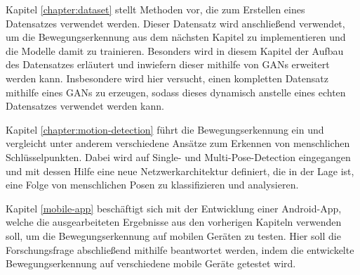 Kapitel \ref{chapter:dataset} stellt Methoden vor, die zum Erstellen eines
Datensatzes verwendet werden. Dieser Datensatz wird anschließend verwendet, um
die Bewegungserkennung aus dem nächsten Kapitel zu implementieren und die
Modelle damit zu trainieren. Besonders wird in diesem Kapitel der Aufbau des
Datensatzes erläutert und inwiefern dieser mithilfe von GANs erweitert werden
kann. Insbesondere wird hier versucht, einen kompletten Datensatz mithilfe eines
GANs zu erzeugen, sodass dieses dynamisch anstelle eines echten Datensatzes
verwendet werden kann.

Kapitel \ref{chapter:motion-detection} führt die Bewegungserkennung ein und
vergleicht unter anderem verschiedene Ansätze zum Erkennen von menschlichen
Schlüsselpunkten. Dabei wird auf Single- und Multi-Pose-Detection eingegangen
und mit dessen Hilfe eine neue Netzwerkarchitektur definiert, die in der Lage
ist, eine Folge von menschlichen Posen zu klassifizieren und analysieren.

Kapitel \ref{mobile-app} beschäftigt sich mit der Entwicklung einer
Android-App, welche die ausgearbeiteten Ergebnisse aus den vorherigen Kapiteln
verwenden soll, um die Bewegungserkennung auf mobilen Geräten zu testen.
Hier soll die Forschungsfrage abschließend mithilfe beantwortet werden, indem
die entwickelte Bewegungserkennung auf verschiedene mobile Geräte getestet wird.
